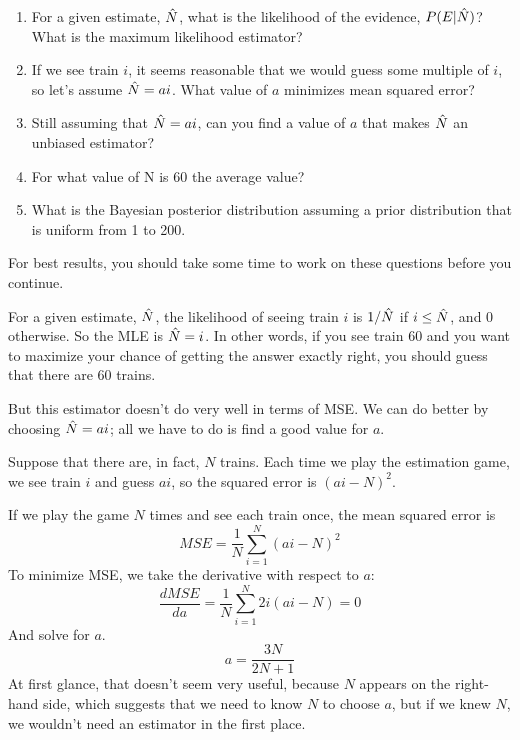 \documentclass[12pt]{book}
\begin{document}
\begin{enumerate}

\item For a given estimate, $\hat{N}$, what is the likelihood of the
  evidence, $P(E|\hat{N})$?  What is the maximum likelihood estimator?


\item If we see train $i$, it seems reasonable that we would guess
  some multiple of $i$, so let's assume $\hat{N} = a i$.  What value of
  $a$ minimizes mean squared error?


\item Still assuming that $\hat{N} = a i$, can you find a value of $a$
  that makes $\hat{N}$ an unbiased estimator?


\item For what value of N is 60 the average value?

\item What is the Bayesian posterior distribution assuming a prior
distribution that is uniform from 1 to 200.


\end{enumerate}

For best results, you should take some time to work on these questions
before you continue.

For a given estimate, $\hat{N}$, the likelihood of seeing train $i$ is
$1 / \hat{N}$ if $i \le \hat{N}$, and 0 otherwise.  So the MLE is $\hat{N} =
i$.  In other words, if you see train 60 and you want to maximize your
chance of getting the answer exactly right, you should guess that there
are 60 trains.

But this estimator doesn't do very well in terms of MSE.  We can do
better by choosing $\hat{N} = a i$; all we have to do is find a good
value for $a$.

Suppose that there are, in fact, $N$ trains.  Each time we play
the estimation game, we see train $i$ and guess $ai$, so the squared
error is $(ai - N)^2$.

If we play the game $N$ times and see each train once, the mean
squared error is 
%
\[ MSE = \frac{1}{N} \sum_{i=1}^N (ai - N)^2 \]
%
To minimize MSE, we take the derivative with respect to $a$:
%
\[ \frac{d MSE}{da} = \frac{1}{N} \sum_{i=1}^N 2i (ai - N) = 0 \]
%
And solve for $a$.
%
\[ a = \frac{3N}{2N+1} \]
%
At first glance, that doesn't seem very useful, because $N$ appears on
the right-hand side, which suggests that we need to know $N$ to choose
$a$, but if we knew $N$, we wouldn't need an estimator in the first place.
\end{document}
